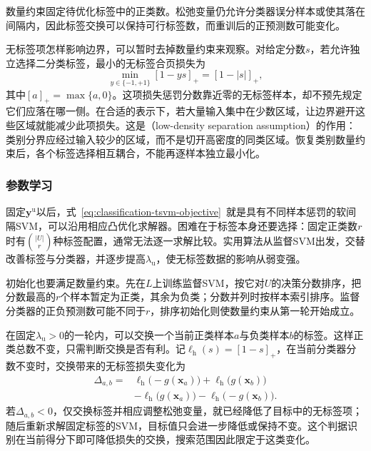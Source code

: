 数量约束固定待优化标签中的正类数。松弛变量仍允许分类器误分样本或使其落在间隔内，因此标签交换可以保持可行标签数，而重训后的正预测数可能变化。

无标签项怎样影响边界，可以暂时去掉数量约束来观察。对给定分数$s$，若允许独立选择二分类标签，最小的无标签合页损失为
\begin{equation}
  \label{eq:classification-tsvm-unlabeled-hinge}
  \min_{y\in\{-1,+1\}}[1-ys]_+=[1-|s|]_+,
\end{equation}
其中$[a]_+=\max\{a,0\}$。这项损失惩罚分数靠近零的无标签样本，却不预先规定它们应落在哪一侧。在合适的表示下，若大量输入集中在少数区域，让边界避开这些区域就能减少此项损失。这是（low-density separation assumption）的作用：类别分界应经过输入较少的区域，而不是切开高密度的同类区域。恢复类别数量约束后，各个标签选择相互耦合，不能再逐样本独立最小化。

\subsubsection{参数学习}
\label{sec:classification-tsvm-learning}

固定$\bm{y}^{\mathrm{u}}$以后，式~\eqref{eq:classification-tsvm-objective}~就是具有不同样本惩罚的软间隔SVM，可以沿用相应凸优化求解器。困难在于标签本身还要选择：固定正类数$r$时有$\binom{|U|}{r}$种标签配置，通常无法逐一求解比较。实用算法从监督SVM出发，交替改善标签与分类器，并逐步提高$\lambda_{\mathrm{u}}$，使无标签数据的影响从弱变强。

初始化也要满足数量约束。先在$L$上训练监督SVM，按它对$U$的决策分数排序，把分数最高的$r$个样本暂定为正类，其余为负类；分数并列时按样本索引排序。监督分类器的正负预测数可能不同于$r$，排序初始化则使数量约束从第一轮开始成立。

在固定$\lambda_{\mathrm{u}}>0$的一轮内，可以交换一个当前正类样本$a$与负类样本$b$的标签。这样正类总数不变，只需判断交换是否有利。记$\ell_{\mathrm{h}}(s)=[1-s]_+$，在当前分类器分数不变时，交换带来的无标签损失变化为
\begin{equation}
  \label{eq:classification-tsvm-swap}
  \begin{aligned}
    \Delta_{a,b}
      ={}&\ell_{\mathrm{h}}\bigl(-g(\bm{x}_a)\bigr)
          +\ell_{\mathrm{h}}\bigl(g(\bm{x}_b)\bigr)\\
       &-\ell_{\mathrm{h}}\bigl(g(\bm{x}_a)\bigr)
          -\ell_{\mathrm{h}}\bigl(-g(\bm{x}_b)\bigr).
  \end{aligned}
\end{equation}
若$\Delta_{a,b}<0$，仅交换标签并相应调整松弛变量，就已经降低了目标中的无标签项；随后重新求解固定标签的SVM，目标值只会进一步降低或保持不变。这个判据识别在当前得分下即可降低损失的交换，搜索范围因此限定于这类变化。

